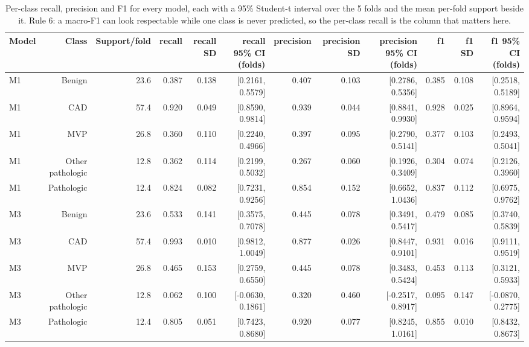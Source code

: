 \begin{table}[htbp]
  \centering
  \caption{Per-class recall, precision and F1 for every model, each with a 95\% Student-t interval over the 5 folds and the mean per-fold support beside it. Rule 6: a macro-F1 can look respectable while one class is never predicted, so the per-class recall is the column that matters here.}
  \label{tab:t-s2}
  \begin{tabular}{lrrrrrrrrrrr}
    \toprule
    Model & Class & Support/fold & recall & recall SD & recall 95\% CI (folds) & precision & precision SD & precision 95\% CI (folds) & f1 & f1 SD & f1 95\% CI (folds) \\
    \midrule
    M1 & Benign & 23.6 & 0.387 & 0.138 & [0.2161, 0.5579] & 0.407 & 0.103 & [0.2786, 0.5356] & 0.385 & 0.108 & [0.2518, 0.5189] \\
    M1 & CAD & 57.4 & 0.920 & 0.049 & [0.8590, 0.9814] & 0.939 & 0.044 & [0.8841, 0.9930] & 0.928 & 0.025 & [0.8964, 0.9594] \\
    M1 & MVP & 26.8 & 0.360 & 0.110 & [0.2240, 0.4966] & 0.397 & 0.095 & [0.2790, 0.5141] & 0.377 & 0.103 & [0.2493, 0.5041] \\
    M1 & Other pathologic & 12.8 & 0.362 & 0.114 & [0.2199, 0.5032] & 0.267 & 0.060 & [0.1926, 0.3409] & 0.304 & 0.074 & [0.2126, 0.3960] \\
    M1 & Pathologic & 12.4 & 0.824 & 0.082 & [0.7231, 0.9256] & 0.854 & 0.152 & [0.6652, 1.0436] & 0.837 & 0.112 & [0.6975, 0.9762] \\
    M3 & Benign & 23.6 & 0.533 & 0.141 & [0.3575, 0.7078] & 0.445 & 0.078 & [0.3491, 0.5417] & 0.479 & 0.085 & [0.3740, 0.5839] \\
    M3 & CAD & 57.4 & 0.993 & 0.010 & [0.9812, 1.0049] & 0.877 & 0.026 & [0.8447, 0.9101] & 0.931 & 0.016 & [0.9111, 0.9519] \\
    M3 & MVP & 26.8 & 0.465 & 0.153 & [0.2759, 0.6550] & 0.445 & 0.078 & [0.3483, 0.5424] & 0.453 & 0.113 & [0.3121, 0.5933] \\
    M3 & Other pathologic & 12.8 & 0.062 & 0.100 & [-0.0630, 0.1861] & 0.320 & 0.460 & [-0.2517, 0.8917] & 0.095 & 0.147 & [-0.0870, 0.2775] \\
    M3 & Pathologic & 12.4 & 0.805 & 0.051 & [0.7423, 0.8680] & 0.920 & 0.077 & [0.8245, 1.0161] & 0.855 & 0.010 & [0.8432, 0.8673] \\

\end{tabular}
\end{table}
